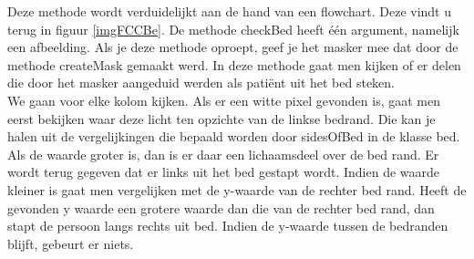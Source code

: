 Deze methode wordt verduidelijkt aan de hand van een flowchart. Deze vindt u terug in figuur \ref{imgFCCBe}. De methode checkBed heeft \'e\'en argument, namelijk een afbeelding. Als je deze methode oproept, geef je het masker mee dat door de methode createMask gemaakt werd. In deze methode gaat men kijken of er delen die door het masker aangeduid werden als pati\"ent uit het bed steken. \\
We gaan voor elke kolom kijken. Als er een witte pixel gevonden is, gaat men eerst bekijken waar deze licht ten opzichte van de linkse bedrand. Die kan je halen uit de vergelijkingen die bepaald worden door sidesOfBed in de klasse bed. Als de waarde groter is, dan is er daar een lichaamsdeel over de bed rand. Er wordt terug gegeven dat er links uit het bed gestapt wordt. Indien de waarde kleiner is gaat men vergelijken met de y-waarde van de rechter bed rand. Heeft de gevonden y waarde een grotere waarde dan die van de rechter bed rand, dan stapt de persoon langs rechts uit bed. Indien de y-waarde tussen de bedranden blijft, gebeurt er niets.

